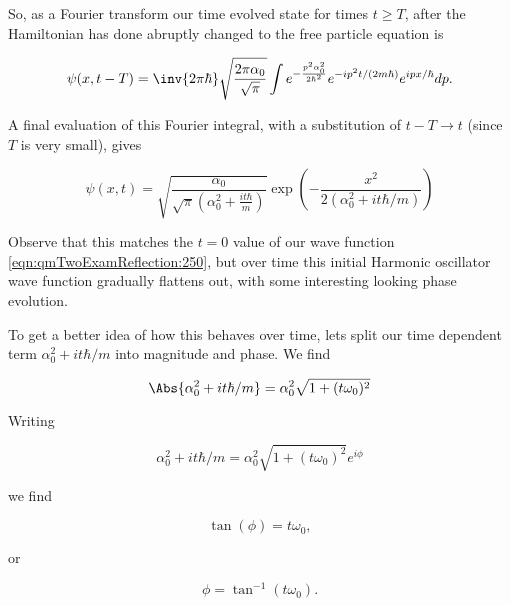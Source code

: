 So, as a Fourier transform our time evolved state for times $t \ge T$, after the Hamiltonian has done abruptly changed to the free particle equation is

\begin{equation}\label{eqn:qmTwoExamReflection:290}
\psi(x, t - T) = 
\inv{2 \pi \hbar} \sqrt{ \frac{2 \pi \alpha_0}{\sqrt{\pi}} }
\int
e^{-\frac{p^2 \alpha_0^2}{2 \hbar^2}} 
e^{-i p^2 t/(2m \hbar)} e^{i p x/\hbar} dp.
\end{equation}

A final evaluation of this Fourier integral, with a substitution of $t - T \rightarrow t$ (since $T$ is very small), gives

\begin{equation}\label{eqn:qmTwoExamReflection:310}
\psi(x, t) = 
\sqrt{\frac{\alpha_0}{\sqrt{\pi} \left( \alpha_0^2 + \frac{i t \hbar}{m} \right)}}
\exp\left(
-\frac{x^2}{2 \left(\alpha_0^2 + i t \hbar/m\right)}
\right)
\end{equation}

Observe that this matches the $t=0$ value of our wave function \ref{eqn:qmTwoExamReflection:250}, but over time this initial Harmonic oscillator wave function gradually flattens out, with some interesting looking phase evolution.  

To get a better idea of how this behaves over time, lets split our time dependent term $\alpha_0^2 + i t \hbar/m$ into magnitude and phase.  We find

\begin{equation}\label{eqn:qmTwoExamReflection:330}
\Abs{\alpha_0^2 + i t \hbar/m} = \alpha_0^2 \sqrt{1 + (t \omega_0)^2}
\end{equation}

Writing 

\begin{equation}\label{eqn:qmTwoExamReflection:350}
\alpha_0^2 + i t \hbar/m = \alpha_0^2 \sqrt{1 + (t \omega_0)^2} e^{i \phi}
\end{equation}

we find

\begin{equation}\label{eqn:qmTwoExamReflection:370}
\tan(\phi) = t \omega_0,
\end{equation}

or

\begin{equation}\label{eqn:qmTwoExamReflection:370b}
\phi = \tan^{-1}(t \omega_0).
\end{equation}


